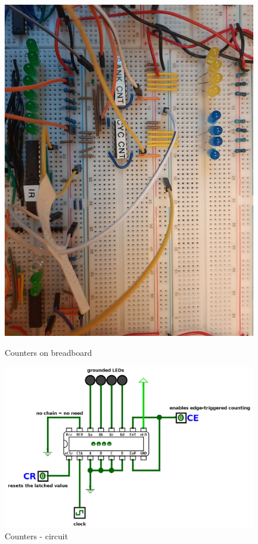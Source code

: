\begin{figure}[H]
	\centering
	\begin{minipage}[b]{0.3\textwidth}
		\includegraphics[width=\textwidth]{img/counters}
		\caption{Counters on breadboard}
	\end{minipage}
	\hfill
	\begin{minipage}[b]{0.6\textwidth}
		\includegraphics[width=\textwidth]{img/counter_circuit_logisim}
		\caption{Counters - circuit}
	\end{minipage}
\end{figure}



